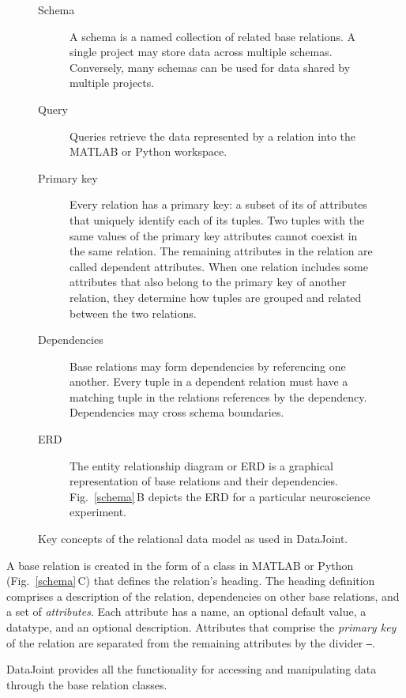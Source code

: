 \documentclass[10pt,letterpaper]{article}
\begin{document}
\begin{figure}
\begin{adjustwidth}{-1.in}{0in}
\begin{boxedminipage}{\textwidth}
\begin{description}
\item[Schema] A schema is a named collection of related base relations. 
A single project may store data across multiple schemas. Conversely, many schemas can be used for data shared by multiple projects.

\item[Query] Queries retrieve the data represented by a relation into the MATLAB or Python workspace.

\item[Primary key] Every relation has a primary key: a subset of its of attributes that uniquely identify each of its tuples. 
Two tuples with the same values of the primary key attributes cannot coexist in the same relation.
The remaining attributes in the relation are called dependent attributes. 
When one relation includes some attributes that also belong to the primary key of another relation, they determine how tuples are grouped and related between the two relations.

\item[Dependencies]
Base relations may form dependencies by referencing one another. 
Every tuple in a dependent relation must have a matching tuple in the relations references by the dependency. 
Dependencies may cross schema boundaries.

\item[ERD]
The entity relationship diagram or ERD is a graphical representation of base relations and their dependencies.
Fig.\ \ref{schema}\,B depicts the ERD for a particular neuroscience experiment. 
\end{description}
\end{boxedminipage}
\caption{Key concepts of the relational data model as used in DataJoint.}
\label{glossary}
\end{adjustwidth}
\end{figure}

A base relation is created in the form of a class in MATLAB or Python (Fig.\ \ref{schema}\,C) that defines the relation's heading.
The heading definition comprises a description of the relation, dependencies on other base relations, and a set of \emph{attributes}. 
Each attribute has a name, an optional default value, a datatype, and an optional description.
Attributes that comprise the \emph{primary key} of the relation are separated from the remaining attributes by the divider {\tt---}.

DataJoint provides all the functionality for accessing and manipulating data through the base relation classes. 
\end{document}
